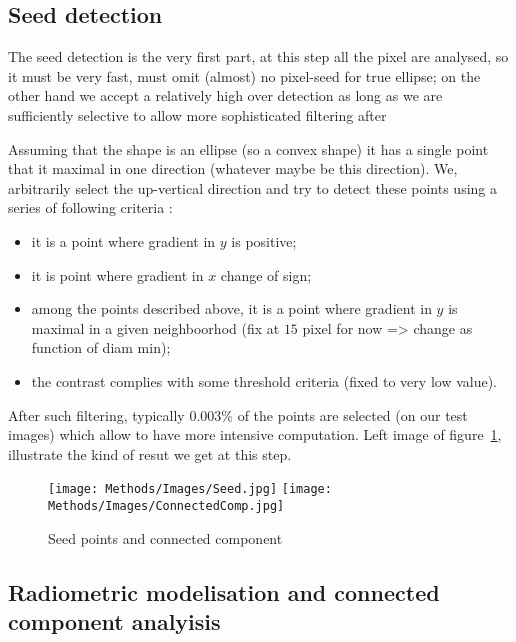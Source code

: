 \subsection{Seed detection}

The seed detection is the very first part, at this step all the pixel are analysed,
so it must be very fast, must omit (almost) no pixel-seed for true ellipse; on the
other hand we accept a relatively high over detection as long as we are sufficiently
selective to allow more sophisticated filtering after 

Assuming that the shape is an ellipse (so a convex shape)
it has a single point that it maximal in one direction (whatever maybe be this direction).
We, arbitrarily select the up-vertical direction and try to detect these points using a
series of following criteria :

\begin{itemize}
      \item  it  is a point where gradient in $y$ is positive;
      \item  it  is point where gradient in $x$ change of sign;
      \item  among the points described above, it is a point where gradient in $y$ is maximal
	      in a given neighboorhod (fix at $15$ pixel for now => change as function of diam min);
      \item  the contrast complies with some threshold criteria (fixed to very low value).
\end{itemize}

After such filtering, typically $0.003\%$ of the points are selected (on our test images) which
allow to have more intensive computation.  Left image of figure~\ref{fig:CodeT:Seed}, illustrate
the kind of resut we get at this step.

\begin{figure}
\centering
	\texttt{[image: Methods/Images/Seed.jpg]}
	\texttt{[image: Methods/Images/ConnectedComp.jpg]}
	\caption{Seed points and connected component}
\label{fig:CodeT:Seed}
\end{figure}


\subsection{Radiometric modelisation and connected component analyisis}

